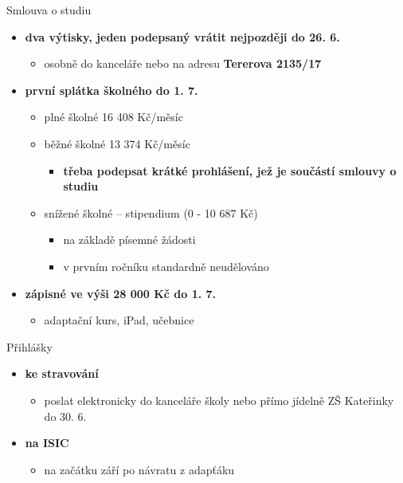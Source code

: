 \documentclass[
		czech,
		sections numbered,
		xcolor=dvipsnames,
		aspectratio=169,
]{beamer}
\begin{document}
\begin{frame}{Smlouva o studiu}
		\begin{itemize}
				\item \textbf<1>{dva výtisky, jeden podepsaný vrátit nejpozději do
						\alert{26. 6.}}
						\begin{itemize}
								\item osobně do kanceláře nebo na adresu \textbf{Tererova 2135/17}
						\end{itemize}
						\pause
				\item \textbf<2>{první splátka školného do \alert{1. 7.}}
						\begin{itemize}
								\item plné školné 16 408 Kč/měsíc
								\item běžné školné 13 374 Kč/měsíc
										\begin{itemize}
												\item \textbf<2>{třeba podepsat krátké prohlášení, jež je součástí
														smlouvy o studiu}
										\end{itemize}
								\item snížené školné -- stipendium (0 - 10 687 Kč)
										\begin{itemize}
												\item na základě písemné žádosti
												\item \alert{v prvním ročníku standardně neudělováno}
										\end{itemize}
						\end{itemize}
						\pause
				\item \textbf<3>{zápisné ve výši 28 000 Kč do \alert{1. 7.}}
						\begin{itemize}
								\item adaptační kurs, iPad, učebnice
						\end{itemize}
		\end{itemize}
\end{frame}

\begin{frame}{Přihlášky}
		\begin{itemize}
				\item \textbf<1>{ke stravování}
						\begin{itemize}
								\item poslat elektronicky do kanceláře školy nebo přímo jídelně ZŠ
										Kateřinky do \alert{30. 6.}
						\end{itemize}
						\pause
				\item \textbf<2>{na ISIC}
						\begin{itemize}
								\item na začátku září po návratu z adapťáku
						\end{itemize}
		\end{itemize}
\end{frame}
\end{document}
